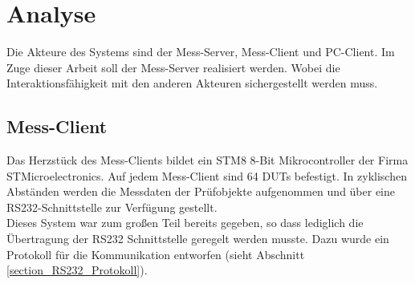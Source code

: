 \section{Analyse}

Die Akteure des Systems sind der Mess-Server, Mess-Client und PC-Client. Im Zuge dieser Arbeit soll der Mess-Server realisiert werden. Wobei die Interaktionsfähigkeit mit den anderen Akteuren sichergestellt werden muss.


\subsection{Mess-Client}
\label{section_Mess-Client}

Das Herzstück des Mess-Clients bildet ein STM8 8-Bit Mikrocontroller der Firma STMicroelectronics.
Auf jedem Mess-Client sind 64 \acp{DUT} befestigt. In zyklischen Abständen werden die Messdaten der Prüfobjekte aufgenommen und über eine RS232-Schnittstelle zur Verfügung gestellt.\\
Dieses System war zum großen Teil bereits gegeben, so dass lediglich die Übertragung der RS232 Schnittstelle geregelt werden musste. Dazu wurde ein Protokoll für die Kommunikation entworfen (sieht Abschnitt \ref{section_RS232_Protokoll}).
 
